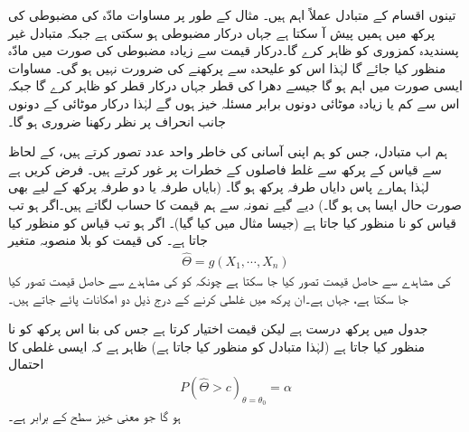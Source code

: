 تینوں اقسام کے متبادل عملاً اہم ہیں۔ مثال کے طور پر مساوات  مادّہ کی  مضبوطی کی پرکھ میں ہمیں پیش آ سکتا ہے جہاں  درکار مضبوطی ہو سکتی ہے جبکہ متبادل غیر پسندیدہ کمزوری کو ظاہر کرے گا۔درکار قیمت سے زیادہ مضبوطی کی صورت میں مادّہ منظور کیا جائے گا لہٰذا اس کو علیحدہ سے پرکھنے کی ضرورت نہیں ہو گی۔ مساوات  ایسی صورت میں اہم ہو گا جیسے دھرا کی قطر جہاں  درکار قطر کو ظاہر کرے گا جبکہ اس سے کم یا زیادہ موٹائی دونوں برابر مسئلہ خیز ہوں گے  لہٰذا درکار موٹائی کے دونوں جانب انحراف پر نظر رکھنا ضروری ہو گا۔

ہم اب متبادل، جس کو ہم اپنی آسانی کی خاطر واحد عدد  تصور کرتے ہیں،  کے لحاظ سے قیاس  کے پرکھ سے غلط فاصلوں کے خطرات پر غور کرتے ہیں۔ فرض کریں  ہے لہٰذا ہمارے پاس دایاں طرفہ پرکھ ہو گا۔ (بایاں طرفہ یا دو طرفہ پرکھ  کے لیے بھی صورت حال ایسا ہی ہو گا۔) دیے گیے نمونہ  سے ہم  قیمت   کا حساب لگاتے ہیں۔اگر  ہو تب قیاس کو نا منظور کیا جاتا ہے (جیسا مثال  میں کیا گیا)۔ اگر  ہو تب قیاس کو منظور کیا جاتا ہے۔ 
 کی قیمت کو بلا منصوبہ متغیر
\begin{align*}
\widehat{\Theta}=g(X_1,\cdots,X_n)
\end{align*}
کی مشاہدے سے حاصل قیمت تصور کیا جا سکتا ہے چونکہ  کو  کی مشاہدے سے حاصل قیمت تصور کیا جا سکتا ہے، جہاں  ہے۔ان پرکھ میں غلطی کرنے کے درج ذیل  دو امکانات  پائے جاتے ہیں۔

جدول  میں پرکھ درست ہے لیکن  قیمت  اختیار کرتا ہے جس کی بنا  اس پرکھ کو نا منظور کیا جاتا ہے (لہٰذا متبادل کو منظور کیا جاتا ہے) ظاہر ہے کہ ایسی غلطی کا احتمال
\begin{align}\label{مساوات_شماریات_غلطی_احتمال_الف}
P(\widehat{\Theta}>c)_{\theta=\theta_0}=\alpha
\end{align}
ہو گا جو معنی خیز سطح کے برابر ہے۔

